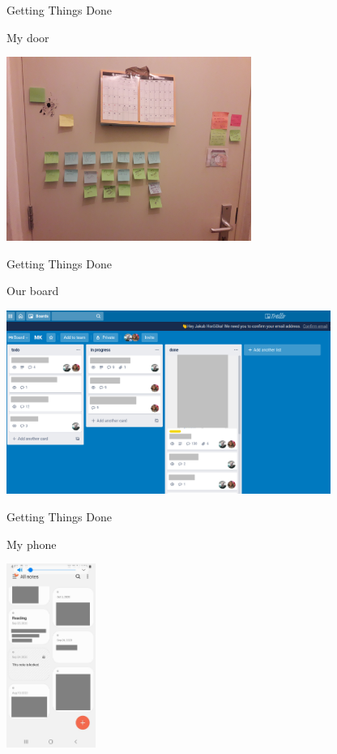 \begin{frame}{Getting Things Done}
  \begin{block}{My door}
    \begin{center}
      \includegraphics[height=6cm]{img/week-agenda-02.jpg}
    \end{center}
  \end{block}
\end{frame}

\begin{frame}{Getting Things Done}
  \begin{block}{Our board}
    \begin{center}
      \includegraphics[height=6cm]{img/trello.png}
    \end{center}
  \end{block}
\end{frame}

\begin{frame}{Getting Things Done}
  \begin{block}{My phone}
    \begin{center}
      \includegraphics[height=6cm]{img/phone-notes.jpg}
    \end{center}
  \end{block}
\end{frame}

